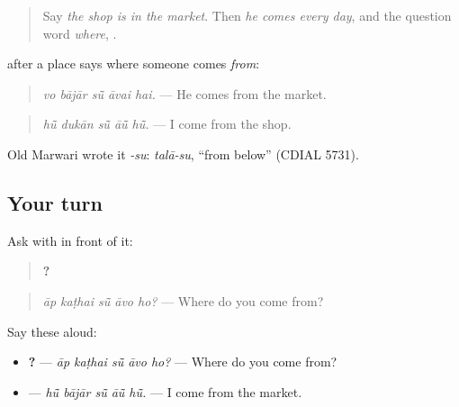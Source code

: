 \label{lesson:MW-C156-su}



\begin{quote}
Say \emph{the shop is in the market}. Then \emph{he comes every day}, and the question word \emph{where}, \textbf{}.
\end{quote}

\begin{grammarlens}[title={Grammar Lens: \mw{सूं}}]
\textbf{} after a place says where someone comes \emph{from}:

\begin{quote}
\textbf{    }
\end{quote}

\begin{quote}
\emph{vo bājār sū̃ āvai hai.} — He comes from the market.
\end{quote}

\begin{quote}
\textbf{    }
\end{quote}

\begin{quote}
\emph{hū̃ dukān sū̃ āū̃ hū̃.} — I come from the shop.
\end{quote}

Old Marwari wrote it \emph{-su}: \emph{talā-su}, \textquotedblleft{}from below\textquotedblright{} (CDIAL 5731).
\end{grammarlens}

\subsection*{Your turn}
Ask with \textbf{} in front of it:

\begin{quote}
\textbf{    ?}
\end{quote}

\begin{quote}
\emph{āp kaṭhai sū̃ āvo ho?} — Where do you come from?
\end{quote}

Say these aloud:

\begin{itemize}
\raggedright
  \item \textbf{    ?} — \emph{āp kaṭhai sū̃ āvo ho?} — Where do you come from?
  \item \textbf{    } — \emph{hū̃ bājār sū̃ āū̃ hū̃.} — I come from the market.
\end{itemize}

